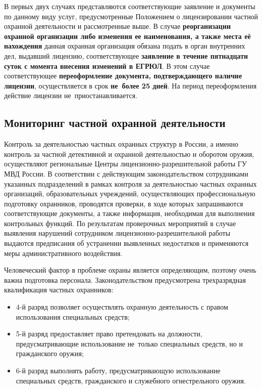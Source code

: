 \documentclass[a4paper,12pt,fleqn]{article} %
\begin{document}
В первых двух случаях представляются соответствующие заявление и документы по данному виду услуг, предусмотренные Положением о лицензировании частной охранной деятельности и рассмотренные выше. 	В случае \textbf{реорганизации охранной организации либо изменения ее наименования, а также места её нахождения} данная охранная организация обязана подать в орган внутренних дел, выдавший лицензию, соответствующее \textbf{заявление в течение пятнадцати суток с момента внесения изменений в ЕГРЮЛ}. В этом случае соответствующее \textbf{переоформление документа, подтверждающего наличие лицензии}, осуществляется в срок \textbf{не~более 25  дней}. На период переоформления действие лицензии не~приостанавливается.

\subsection{Мониторинг частной охранной деятельности}

Контроль за деятельностью частных охранных структур в России, а именно  контроль за частной детективной и охранной деятельностью и оборотом оружия, осуществляют региональные Центры лицензионно-разрешительной работы ГУ МВД России.  В соответствии с действующим законодательством сотрудниками указанных подразделений в рамках контроля за деятельностью частных охранных организаций, образовательных учреждений, осуществляющих профессиональную подготовку охранников, проводятся проверки, в ходе которых запрашиваются соответствующие документы, а также информация, необходимая для выполнения контрольных функций. По результатам проверочных мероприятий в случае выявления нарушений сотрудником лицензионно-разрешительной работы выдаются предписания об устранении выявленных недостатков и применяются меры административного воздействия.

Человеческий фактор в проблеме охраны является определяющим, поэтому очень важна подготовка персонала. Законодательством предусмотрена трехразрядная квалификация частных охранников: 

\begin{itemize}
	\item 4-й разряд позволяет осуществлять охранную деятельность с правом использования специальных средств; 
	\item 5-й разряд предоставляет право претендовать на должности, предусматривающие использование не~только специальных средств, но и гражданского оружия; 
	\item 6-й разряд выполнять работу, предусматривающую использование специальных средств, гражданского и служебного огнестрельного оружия.
\end{itemize}
\end{document}
